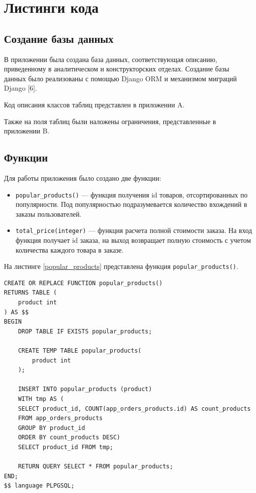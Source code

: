 \section{Листинги кода}

\subsection{Создание базы данных}

В приложении была создана база данных, соответствующая описанию, приведенному в аналитическом и конструкторских отделах. Создание базы данных было реализованы с помощью Django ORM и механизмом миграций Django [6].

Код описания классов таблиц представлен в приложении A.

Также на поля таблиц были наложены ограничения, представленные в приложении B.

\subsection{Функции}

Для работы приложения было создано две функции:

\begin{itemize}
	\item \verb;popular_products(); --- функция получения id товаров, отсортированных по популярности. Под популярностью подразумевается количество вхождений в заказы пользователей.
	\item \verb;total_price(integer); --- функция расчета полной стоимости заказа. На вход функция получает id заказа, на выход возвращает полную стоимость с учетом количества каждого товара в заказе.
\end{itemize}

На листинге \ref{popular_products} представлена функция \verb;popular_products();.

\captionsetup{singlelinecheck = false, justification=raggedright}
\begin{lstlisting}[label=popular_products,caption=Функция получения популярных товаров]
CREATE OR REPLACE FUNCTION popular_products()
RETURNS TABLE (
    product int
) AS $$
BEGIN
    DROP TABLE IF EXISTS popular_products;

    CREATE TEMP TABLE popular_products(
        product int
    );

    INSERT INTO popular_products (product)
    WITH tmp AS (
	SELECT product_id, COUNT(app_orders_products.id) AS count_products
	FROM app_orders_products
	GROUP BY product_id
	ORDER BY count_products DESC)
    SELECT product_id FROM tmp;

    RETURN QUERY SELECT * FROM popular_products;
END;
$$ language PLPGSQL;
\end{lstlisting}

